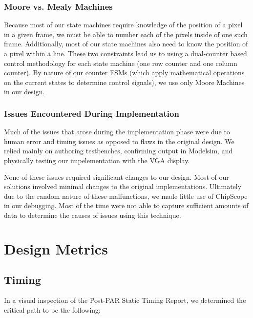 \subsubsection{Moore vs. Mealy Machines}

Because most of our state machines require knowledge of the position of a pixel
in a given frame, we must be able to number each of the pixels inside of one 
such frame. Additionally, most of our state machines also need to know the position
of a pixel within a line. These two constraints lead us to using a dual-counter
based control methodology for each state machine (one row counter and one column counter). 
By nature of our counter FSMs (which apply mathematical operations on the current states 
to determine control signals), we use only Moore Machines in our design.

\subsubsection{Issues Encountered During Implementation}

Much of the issues that arose during the implementation phase were due to 
human error and timing issues as opposed to flaws in the original design. We relied
mainly on authoring testbenches, confirming output in Modelsim, and physically 
testing our impelementation with the VGA display.

None of these issues required significant changes to our design. Most of our solutions
involved minimal changes to the original implementations. Ultimately 
due to the random nature of these malfunctions, we made little use of ChipScope in our
debugging. Most of the time were not able to capture sufficient amounts of 
data to determine the causes of issues using this technique.

\section{Design Metrics}

\subsection{Timing}

In a visual inspection of the Post-PAR Static Timing Report, we determined the critical path to be
the following:

